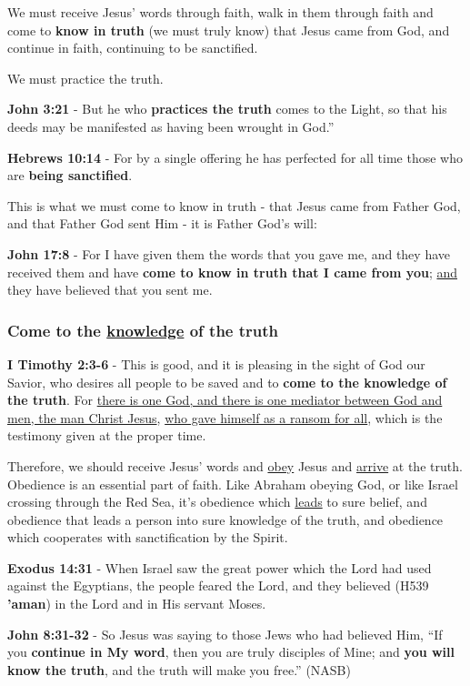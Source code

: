\documentclass[11pt]{article}
\begin{document}
We must receive Jesus' words through faith, walk in them through faith and come to \textbf{know in truth} (we must truly know) that Jesus came from God, and continue in faith, continuing to be sanctified.

We must practice the truth.

\textbf{John 3:21} - But he who \textbf{practices the truth} comes to the Light, so that his deeds may be manifested as having been wrought in God.”

\textbf{Hebrews 10:14} - For by a single offering he has perfected for all time those who are \textbf{being sanctified}.

This is what we must come to know in truth - that Jesus came from Father God, and that Father God sent Him - it is Father God's will:

\textbf{John 17:8} - For I have given them the words that you gave me, and they have received them and have \textbf{come to know in truth that I came from you}; \uline{and} they have believed that you sent me.

\subsubsection{Come to the \underline{knowledge} of the truth}
\label{sec:orgf6448f8}

\textbf{I Timothy 2:3-6} - This is good, and it is pleasing in the sight of God our Savior, who desires all people to be saved and to \textbf{come to the knowledge of the truth}. For \uline{there is one God, and there is one mediator between God and men, the man Christ Jesus}, \uline{who gave himself as a ransom for all}, which is the testimony given at the proper time.

Therefore, we should receive Jesus' words and \uline{obey} Jesus and \uline{arrive} at the truth. Obedience is an essential part of faith. Like Abraham obeying God, or like Israel crossing through the Red Sea, it's obedience which \uline{leads} to sure belief, and obedience that leads a person into sure knowledge of the truth, and obedience which cooperates with sanctification by the Spirit.

\textbf{Exodus 14:31} - When Israel saw the great power which the Lord had used against the Egyptians, the people feared the Lord, and they believed (H539 \textbf{'aman}) in the Lord and in His servant Moses.

\textbf{John 8:31-32} - So Jesus was saying to those Jews who had believed Him, “If you \textbf{continue in My word}, then you are truly disciples of Mine; and \textbf{you will know the truth}, and the truth will make you free.” (NASB)
\end{document}
